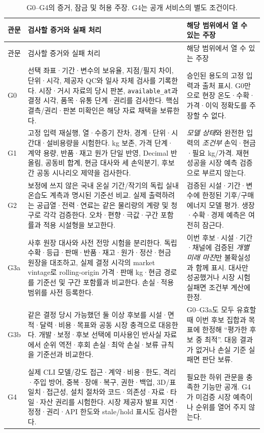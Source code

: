 \documentclass[11pt,a4paper]{article}
\newcommand{\hold}{\textsf{판단 보류}}
\begin{document}
\begin{longtable}{p{1.3cm}p{7.05cm}p{5.0cm}}
\caption{G0--G4의 증거, 잠금 및 허용 주장. G4는 공개 서비스의 별도 조건이다.}\label{tab:gates}\\
\toprule
관문 & 검사할 증거와 실패 처리 & 해당 범위에서 열 수 있는 주장 \\
\midrule
\endfirsthead
\toprule
관문 & 검사할 증거와 실패 처리 & 해당 범위에서 열 수 있는 주장 \\
\midrule
\endhead
G0 & 선택 좌표·기간·변수의 보유율, 지점/필지 차이, 단위·시각, 제공자 QC와 일사 자체 검사를 기록한다. 시장·거시 자료의 당시 판본, \texttt{available\_at}과 결정 시각, 품목·유통 단계·권리를 검사한다. 핵심 결측/권리·판본 미확인은 해당 자료 채택을 보류한다. & 승인된 용도의 고정 입력과 출처 표시. G0만으로 현장 온도·수확·가격·이익 정확도를 주장할 수 없다. \\
G1 & 고정 입력 재실행, 열·수증기 잔차, 경계·단위·시간대·설비용량을 시험한다. kg 보존, 가격 단계·계약 용량, 반품·재고 원가 단일 반영, Decimal 반올림, 공동비 합계, 현금 대사와 세 손익분기, 후보 간 공동 시나리오 제약을 검사한다. & \emph{모델 상태}와 완전한 입력의 \emph{조건부} 손익·현금·필요 kg/가격. 재현 성공을 시장 예측 검증으로 부르지 않는다. \\
G2 & 보정에 쓰지 않은 국내 온실 기간/작기의 독립 실내 온습도 계측과 명시된 기준선 비교. 실제 출력하려는 공급열·전력·연료는 같은 물리량의 계량 및 청구로 각각 검증한다. 오차·편향·극값·구간 포함률과 적용 시설형을 보고한다. & 검증된 시설·기간·변수에 한정된 기후/구매 에너지 모델 평가. 생장·수확·경제 예측은 여전히 잠근다. \\
G3a & 사후 원장 대사와 사전 전망 시험을 분리한다. 독립 수확·등급·판매·반품·재고·원가·정산·현금 원장을 대조하고, 실제 결정 시각의 market vintage로 rolling-origin 가격·판매 kg·현금 경로를 기준선 및 구간 포함률과 비교한다. 손실·적용 범위를 사전 등록한다. & 이번 후보·시설·기간·채널에 검증된 \emph{개별 미래 마진}만 불확실성과 함께 표시. 대사만 성공했거나 시장 시험 실패면 조건부 계산에 한정. \\
G3b & 같은 결정 당시 가능했던 둘 이상 후보를 시설·면적·달력·비용·목표와 공동 시장 충격으로 대응한다. 개발·보정·후보 선택에 미사용인 반사실 자료에서 순위 역전·후회 손실·최악 손실·보류 규칙을 기준선과 비교한다. & G0--G3a도 모두 유효할 때 이번 후보 집합과 목표에 한정해 ``평가한 후보 중 최적''. 대응 결과가 없거나 손실 기준 실패면 \hold. \\
G4 & 실제 CLI 모델/강도 접근·계약·비용·한도, 격리·주입 방어, 중복·장애·복구, 권한·백업, 3D/표 일치·접근성, 설치 절차와 코드·의존성·자료·타일·자산 권리를 시험한다. 시장 제공자 발표 지연·정정·권리·API 한도와 stale/hold 표시도 검사한다. & 필요한 하위 관문을 충족한 기능만 공개. G4가 미검증 시장 예측이나 순위를 열어 주지 않는다. \\
\bottomrule
\end{longtable}
\end{document}
